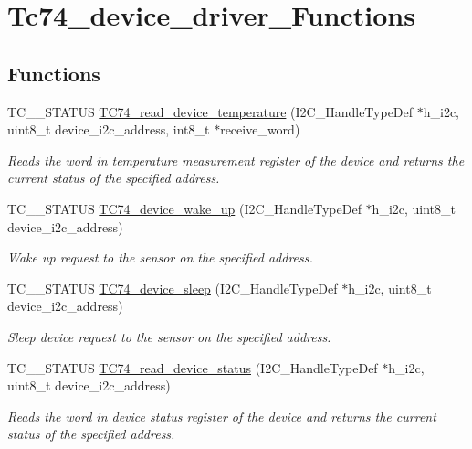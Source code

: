 \hypertarget{group__tc74__device__driver___functions}{\section{Tc74\-\_\-device\-\_\-driver\-\_\-\-Functions}
\label{group__tc74__device__driver___functions}
}
\subsection*{Functions}
\begin{DoxyCompactItemize}
\item 
T\-C\-\_\-\_\-\-S\-T\-A\-T\-U\-S \hyperlink{group__tc74__device__driver___functions_gaaad8e710b5b20ff439c20c3e6a1899df}{T\-C74\-\_\-read\-\_\-device\-\_\-temperature} (I2\-C\-\_\-\-Handle\-Type\-Def $\ast$h\-\_\-i2c, uint8\-\_\-t device\-\_\-i2c\-\_\-address, int8\-\_\-t $\ast$receive\-\_\-word)
\begin{DoxyCompactList}\small\item\em Reads the word in temperature measurement register of the device and returns the current status of the specified address. \end{DoxyCompactList}\item 
T\-C\-\_\-\_\-\-S\-T\-A\-T\-U\-S \hyperlink{group__tc74__device__driver___functions_gac7c41cdd9ddc545f8ba0cf9502211825}{T\-C74\-\_\-device\-\_\-wake\-\_\-up} (I2\-C\-\_\-\-Handle\-Type\-Def $\ast$h\-\_\-i2c, uint8\-\_\-t device\-\_\-i2c\-\_\-address)
\begin{DoxyCompactList}\small\item\em Wake up request to the sensor on the specified address. \end{DoxyCompactList}\item 
T\-C\-\_\-\_\-\-S\-T\-A\-T\-U\-S \hyperlink{group__tc74__device__driver___functions_ga3763067025ca01685ccae3b7c2d8bc8d}{T\-C74\-\_\-device\-\_\-sleep} (I2\-C\-\_\-\-Handle\-Type\-Def $\ast$h\-\_\-i2c, uint8\-\_\-t device\-\_\-i2c\-\_\-address)
\begin{DoxyCompactList}\small\item\em Sleep device request to the sensor on the specified address. \end{DoxyCompactList}\item 
T\-C\-\_\-\_\-\-S\-T\-A\-T\-U\-S \hyperlink{group__tc74__device__driver___functions_ga03276e6c60fb80c35af1bd788a4dabbd}{T\-C74\-\_\-read\-\_\-device\-\_\-status} (I2\-C\-\_\-\-Handle\-Type\-Def $\ast$h\-\_\-i2c, uint8\-\_\-t device\-\_\-i2c\-\_\-address)
\begin{DoxyCompactList}\small\item\em Reads the word in device status register of the device and returns the current status of the specified address. \end{DoxyCompactList}\end{DoxyCompactItemize}


